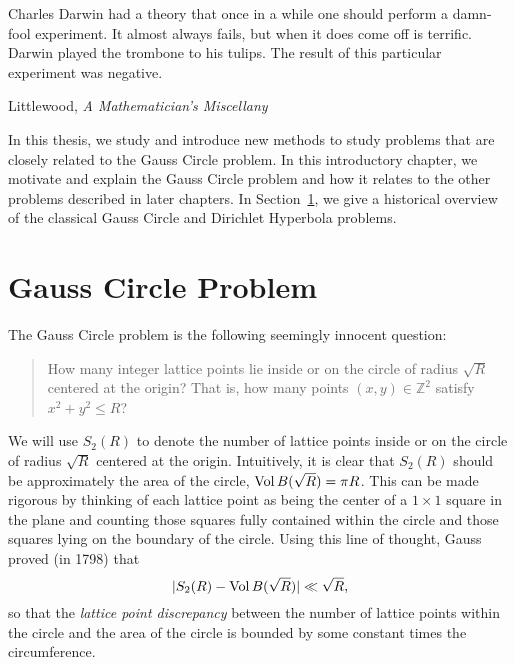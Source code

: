 

\hfill
\begin{minipage}{4in}
  \small
  \singlespacing{}
  Charles Darwin had a theory that once in a while one should perform a damn-fool
  experiment.
  It almost always fails, but when it does come off is terrific.\\

  Darwin played the trombone to his tulips.
  The result of this particular experiment was negative.
  \vspace{.3ex}
  \begin{flushright}
    {Littlewood, \textit{A Mathematician's Miscellany}}
  \end{flushright}
\end{minipage}





In this thesis, we study and introduce new methods to study problems that are closely
related to the Gauss Circle problem.
In this introductory chapter, we motivate and explain the Gauss Circle problem and how it
relates to the other problems described in later chapters.
In Section~\ref{sec:intro:GaussCircleExplanation}, we give a historical overview of the
classical Gauss Circle and Dirichlet Hyperbola problems.




\section{Gauss Circle Problem}\label{sec:intro:GaussCircleExplanation}




The Gauss Circle problem is the following seemingly innocent question:
\begin{quote}
  How many integer lattice points lie inside or on the circle of radius $\sqrt R$ centered
  at the origin? That is, how many points $(x,y) \in \mathbb{Z}^2$ satisfy $x^2 + y^2 \leq
  R$?
\end{quote}
We will use $S_2(R)$ to denote the number of lattice points inside or on the circle of
radius $\sqrt R$ centered at the origin.
Intuitively, it is clear that $S_2(R)$ should be approximately the area of the circle,
$\operatorname*{Vol} B(\sqrt R) = \pi R$.
This can be made rigorous by thinking of each lattice point as being the center of a $1
\times 1$ square in the plane and counting those squares fully contained within the circle
and those squares lying on the boundary of the circle.
Using this line of thought, Gauss proved (in 1798) that
\begin{equation}
  \lvert S_2(R) - \operatorname*{Vol} B(\sqrt R) \rvert \ll \sqrt R,
\end{equation}
so that the \emph{lattice point discrepancy} between the
number of lattice points within the circle and the area of the circle is bounded by some
constant times the circumference.


